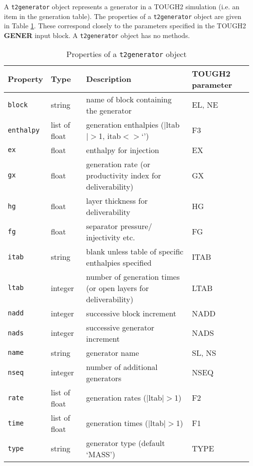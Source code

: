 A \texttt{t2generator} object represents a generator in a TOUGH2 simulation (i.e. an item in the generation table).  The properties of a \texttt{t2generator} object are given in Table \ref{tb:t2generator_properties}.  These correspond closely to the parameters specified in the TOUGH2 \textbf{GENER} input block.  A \texttt{t2generator} object has no methods.

\begin{table}
  \begin{center}
    \begin{tabular}{|l|l|p{60mm}|p{20mm}|}
      \hline
      \textbf{Property} & \textbf{Type} & \textbf{Description} & \textbf{TOUGH2 parameter}\\
      \hline
      \texttt{block} & string & name of block containing the generator & EL, NE\\
      \texttt{enthalpy} & list of float & generation enthalpies ($|$ltab$|>$1, itab$<>$`')& F3\\
      \texttt{ex} & float & enthalpy for injection & EX\\
      \texttt{gx} & float & generation rate (or productivity index for deliverability) & GX\\
      \texttt{hg} & float & layer thickness for deliverability & HG\\
      \texttt{fg} & float & separator pressure/ injectivity etc. & FG\\
      \texttt{itab} & string & blank unless table of specific enthalpies specified & ITAB\\
      \texttt{ltab} & integer & number of generation times (or open layers for deliverability) & LTAB\\
      \texttt{nadd} & integer & successive block increment & NADD\\
      \texttt{nads} & integer & successive generator increment & NADS\\
      \texttt{name} & string & generator name & SL, NS\\
      \texttt{nseq} & integer & number of additional generators & NSEQ\\
      \texttt{rate} & list of float & generation rates ($|$ltab$|>$1)& F2\\
      \texttt{time} & list of float & generation times ($|$ltab$|>$1)& F1\\
      \texttt{type} & string & generator type (default `MASS') & TYPE\\
      \hline
    \end{tabular}
    \caption{Properties of a \texttt{t2generator} object}
    \label{tb:t2generator_properties}
  \end{center}
\end{table}

